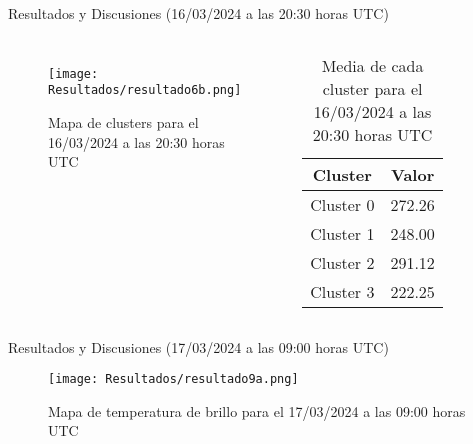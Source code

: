 \documentclass[aspectratio=169,xcolor=dvipsnames]{beamer}
\begin{document}
\begin{frame}{Resultados y Discusiones (16/03/2024 a las 20:30 horas UTC)}
    \begin{columns}

        \begin{figure}
            \centering
            \texttt{[image: Resultados/resultado6b.png]}
            {\footnotesize %
            \caption{Mapa de clusters para el 16/03/2024 a las 20:30 horas UTC}
            \label{fig19}
            }
        \end{figure}

        \centering
        \begin{table}[h!]
            \centering
            {\footnotesize %
            \begin{tabular}{|c|c|}
                \hline
                \textbf{Cluster} & \textbf{Valor} \\
                \hline
                Cluster 0 & 272.26 \\
                Cluster 1 & 248.00 \\
                Cluster 2 & 291.12 \\
                Cluster 3 & 222.25 \\                
                \hline
            \end{tabular}
            \caption{Media de cada cluster para el 16/03/2024 a las 20:30 horas UTC}
            }
        \end{table}

    \end{columns}
\end{frame}
\begin{frame}{Resultados y Discusiones (17/03/2024 a las 09:00 horas UTC)}
\begin{figure}
    \centering
    \texttt{[image: Resultados/resultado9a.png]}
    \caption{Mapa de temperatura de brillo para el 17/03/2024 a las 09:00 horas UTC}
    \label{fig20}
\end{figure}
\end{frame}
\end{document}
